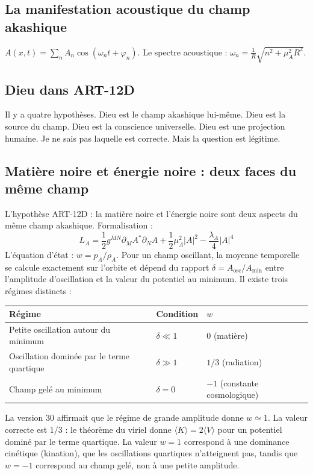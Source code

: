 \subsection{La manifestation acoustique du champ akashique}
$A(x,t) = \sum_n A_n \cos(\omega_n t + \varphi_n)$. Le spectre acoustique : $\omega_n = \frac{1}{R} \sqrt{n^2 + \mu_A^2 R^2}$.

\subsection{Dieu dans ART-12D}
Il y a quatre hypothèses. Dieu est le champ akashique lui-même. Dieu est la source du champ. Dieu est la conscience universelle. Dieu est une projection humaine. Je ne sais pas laquelle est correcte. Mais la question est légitime.

\subsection{Matière noire et énergie noire : deux faces du même champ}
L'hypothèse ART-12D : la matière noire et l'énergie noire sont deux aspects du même champ akashique. Formalisation :
\begin{equation}
L_A = \frac{1}{2} g^{MN} \partial_M A^* \partial_N A + \frac{1}{2} \mu_A^2 |A|^2 - \frac{\lambda_A}{4} |A|^4
\end{equation}
L'équation d'état : $w = p_A / \rho_A$. Pour un champ oscillant, la moyenne temporelle se calcule exactement sur l'orbite et dépend du rapport $\delta = A_{\text{osc}}/A_{\min}$ entre l'amplitude d'oscillation et la valeur du potentiel au minimum. Il existe trois régimes distincts :
\begin{center}
\begin{tabular}{@{}lll@{}}
\toprule
\textbf{Régime} & \textbf{Condition} & $w$ \\ \midrule
Petite oscillation autour du minimum & $\delta \ll 1$ & $0$ (matière) \\
Oscillation dominée par le terme quartique & $\delta \gg 1$ & $1/3$ (radiation) \\
Champ gelé au minimum & $\delta = 0$ & $-1$ (constante cosmologique) \\ \bottomrule
\end{tabular}
\end{center}
La version 30 affirmait que le régime de grande amplitude donne $w \simeq 1$. La valeur correcte est $1/3$ : le théorème du viriel donne $\langle K \rangle = 2\langle V \rangle$ pour un potentiel dominé par le terme quartique. La valeur $w = 1$ correspond à une dominance cinétique (kination), que les oscillations quartiques n'atteignent pas, tandis que $w = -1$ correspond au champ gelé, non à une petite amplitude.
